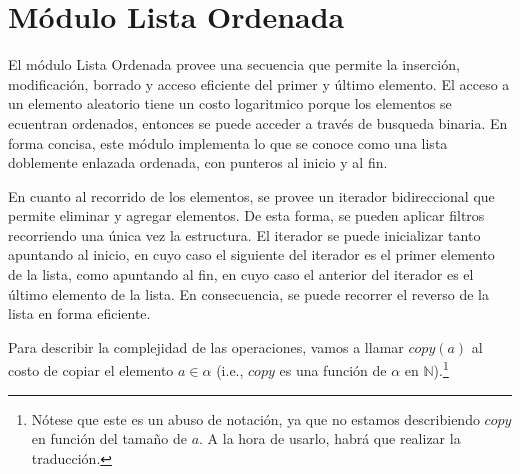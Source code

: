 \section{Módulo Lista Ordenada}

El módulo Lista Ordenada provee una secuencia que permite la inserción, modificación, borrado y acceso eficiente del primer y último elemento.  El acceso a un elemento aleatorio tiene un costo logaritmico porque los elementos se ecuentran ordenados, entonces se puede acceder a trav\'es de busqueda binaria. En forma concisa, este módulo implementa lo que se conoce como una lista doblemente enlazada ordenada, con punteros al inicio y al fin.

En cuanto al recorrido de los elementos, se provee un iterador bidireccional que permite eliminar y agregar elementos.  De esta forma, se pueden aplicar filtros recorriendo una única vez la estructura.  El iterador se puede inicializar tanto apuntando al inicio, en cuyo caso el siguiente del iterador es el primer elemento de la lista, como apuntando al fin, en cuyo caso el anterior del iterador es el último elemento de la lista.  En consecuencia, se puede recorrer el reverso de la lista en forma eficiente.

Para describir la complejidad de las operaciones, vamos a llamar $copy(a)$ al costo de copiar el elemento $a \in \alpha$ (i.e., $copy$ es una función de $\alpha$ en $\mathbb{N}$).\footnote{Nótese que este es un abuso de notación, ya que no estamos describiendo $copy$ en función del tamaño de $a$.  A la hora de usarlo, habrá que realizar la traducción.}

